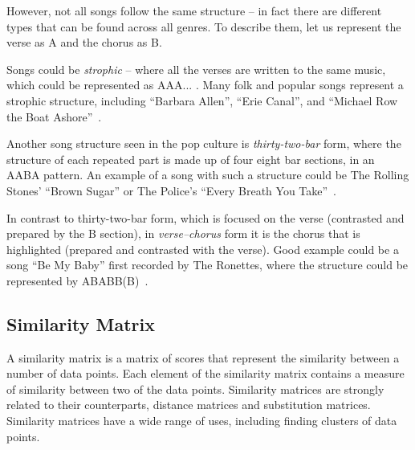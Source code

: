 However, not all songs follow the same structure -- in fact there are different types that can be found across all genres. To describe them, let us represent the verse as A and the chorus as B. 

Songs could be \textit{strophic} -- where all the verses are written to the same music, which could be represented as AAA... . Many folk and popular songs represent a strophic structure, including ``Barbara Allen'', ``Erie Canal'', and ``Michael Row the Boat Ashore''~\cite{strophic}.

Another song structure seen in the pop culture is \textit{thirty-two-bar} form, where the structure of each repeated part is made up of four eight bar sections, in an AABA pattern. An example of a song with such a structure could be The Rolling Stones' ``Brown Sugar'' or The Police's ``Every Breath You Take''~\cite{32bar}. 

In contrast to thirty-two-bar form, which is focused on the verse (contrasted and prepared by the B section), in \textit{verse–chorus} form it is the chorus that is highlighted (prepared and contrasted with the verse). Good example could be a song ``Be My Baby'' first recorded by The Ronettes, where the structure could be represented by ABABB(B)~\cite{32bar}.



\subsection{Similarity Matrix}

A similarity matrix is a matrix of scores that represent the similarity between a number of data points. Each element of the similarity matrix contains a measure of similarity between two of the data points. Similarity matrices are strongly related to their counterparts, distance matrices and substitution matrices.
Similarity matrices have a wide range of uses, including finding clusters of data points.

